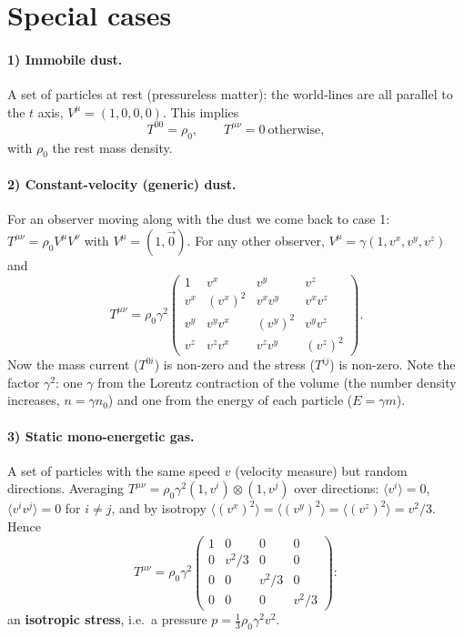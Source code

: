 \section{Special cases}

\paragraph{1) Immobile dust.} A set of particles at rest (pressureless matter): the world-lines are all parallel to the $t$ axis, $V^\mu=(1,0,0,0)$. This implies
\begin{equation}
  T^{00}=\rho_0,\qquad T^{\mu\nu}=0\ \text{otherwise},
\end{equation}
with $\rho_0$ the rest mass density.

\paragraph{2) Constant-velocity (generic) dust.} For an observer moving along with the dust we come back to case 1: $T^{\mu\nu}=\rho_0V^\mu V^\nu$ with $V^\mu=(1,\vec 0)$. For any other observer, $V^\mu=\gamma(1,v^x,v^y,v^z)$ and
\begin{equation}
  T^{\mu\nu}=\rho_0\gamma^2\begin{pmatrix}1&v^x&v^y&v^z\\ v^x&(v^x)^2&v^xv^y&v^xv^z\\ v^y&v^yv^x&(v^y)^2&v^yv^z\\ v^z&v^zv^x&v^zv^y&(v^z)^2\end{pmatrix}.
\end{equation}
Now the mass current ($T^{0i}$) is non-zero and the stress ($T^{ij}$) is non-zero. Note the factor $\gamma^2$: one $\gamma$ from the Lorentz contraction of the volume (the number density increases, $n=\gamma n_0$) and one from the energy of each particle ($E=\gamma m$).

\paragraph{3) Static mono-energetic gas.} A set of particles with the same speed $v$ (velocity measure) but random directions. Averaging $T^{\mu\nu}=\rho_0\gamma^2(1,v^i)\otimes(1,v^j)$ over directions: $\langle v^i\rangle=0$, $\langle v^iv^j\rangle=0$ for $i\neq j$, and by isotropy $\langle(v^x)^2\rangle=\langle(v^y)^2\rangle=\langle(v^z)^2\rangle=v^2/3$. Hence
\begin{equation}
  T^{\mu\nu}=\rho_0\gamma^2\begin{pmatrix}1&0&0&0\\0&v^2/3&0&0\\0&0&v^2/3&0\\0&0&0&v^2/3\end{pmatrix}:
\end{equation}
an \textbf{isotropic stress}, i.e.\ a pressure $p=\frac13\rho_0\gamma^2v^2$.

